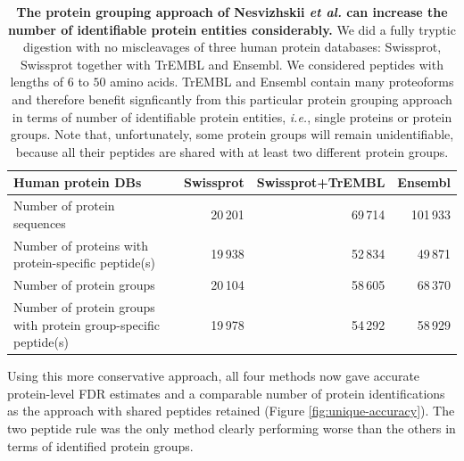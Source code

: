 \documentclass{article}
\begin{document}
\begin{table}[!htp]
  \begin{center}
  
\begin{tabular}{|l|r|r|r|}
\hline
Human protein DBs & Swissprot & Swissprot+TrEMBL & Ensembl\\
\hline
Number of protein sequences & 20\,201 & 69\,714 & 101\,933\\
\hline
Number of proteins with protein-specific peptide(s) & 19\,938 & 52\,834 &
49\,871\\
\hline
Number of protein groups & 20\,104 & 58\,605 & 68\,370\\
\hline
Number of protein groups with protein group-specific peptide(s) & 19\,978 &
54\,292 & 58\,929\\
\hline
\end{tabular}

  \end{center}
  \caption{\label{tab:duplicate-proteins}\textbf{The protein grouping
approach of Nesvizhskii {\em et al.} can increase the number of
identifiable protein entities considerably.} We did a fully tryptic
digestion with no miscleavages of three human protein databases:
Swissprot, Swissprot together with TrEMBL and Ensembl. We considered
peptides with lengths of $6$ to $50$ amino acids. TrEMBL and Ensembl
contain many proteoforms and therefore benefit signficantly from this
particular protein grouping approach in terms of number of
identifiable protein entities, {\em i.e.}, single proteins or protein
groups. Note that, unfortunately, some protein groups will remain
unidentifiable, because all their peptides are shared with at least
two different protein groups.}
\end{table}

Using this more conservative approach, all four methods now gave
accurate protein-level FDR estimates and a comparable number of
protein identifications as the approach with shared peptides retained
(Figure \ref{fig:unique-accuracy}). The two peptide rule was the only
method clearly performing worse than the others in terms of
identified protein groups.
\end{document}
